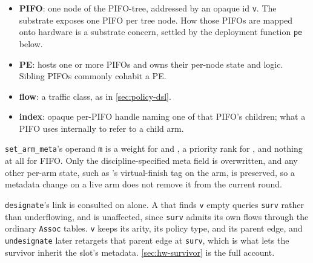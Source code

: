 \begin{itemize}
\item \textbf{PIFO}: one node of the PIFO-tree, addressed by an opaque id \texttt{v}.
The substrate exposes one PIFO per tree node.
How those PIFOs are mapped onto hardware is a substrate concern, settled by the deployment function \texttt{pe} below.
\item \textbf{PE}: hosts one or more PIFOs and owns their per-node state and logic.
Sibling PIFOs commonly cohabit a PE.
\item \textbf{flow}: a traffic class, as in \cref{sec:policy-dsl}.
\item \textbf{index}: opaque per-PIFO handle naming one of that PIFO's children; what a PIFO uses internally to refer to a child arm.
\end{itemize}

\texttt{set\_arm\_meta}'s operand \texttt{m} is a weight for \RR{} and \WFQ, a priority rank for \Strict, and nothing at all for FIFO.
Only the discipline-specified meta field is overwritten, and any other per-arm state, such as \WFQ's virtual-finish tag on the arm, is preserved, so a metadata change on a live arm does not remove it from the current round.

\texttt{designate}'s link is consulted on \pop{} alone.
A \pop{} that finds \texttt{v} empty queries \texttt{surv} rather than underflowing, and \push{} is unaffected, since \texttt{surv} admits its own flows through the ordinary \texttt{Assoc} tables.
\texttt{v} keeps its arity, its policy type, and its parent edge, and \texttt{undesignate} later retargets that parent edge at \texttt{surv}, which is what lets the survivor inherit the slot's metadata.
\cref{sec:hw-survivor} is the full account.

